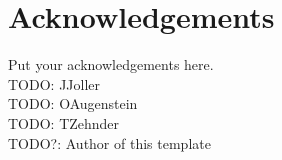 

\bigskip


\begingroup

\let\clearpage\relax
\let\cleardoublepage\relax
\let\cleardoublepage\relax

\chapter*{Acknowledgements} %

Put your acknowledgements here.\\

\noindent TODO: JJoller \\

\noindent TODO: OAugenstein \\

\noindent TODO: TZehnder \\

\noindent TODO?: Author of this template \\

\endgroup
